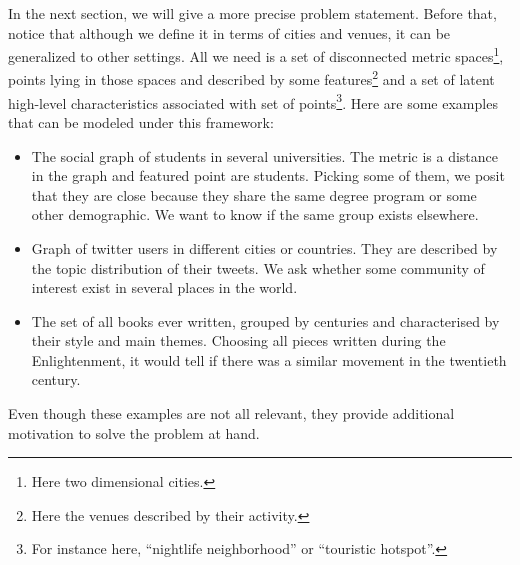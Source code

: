 In the next section, we will give a more precise problem statement. Before
that, notice that although we define it in terms of cities and venues, it can
be generalized to other settings. All we need is a set of disconnected metric
spaces\footnote{Here two dimensional cities.}, points lying in those spaces
and described by some features\footnote{Here the venues described by their
activity.} and a set of latent high-level characteristics associated with set
of points\footnote{For instance here, \enquote{nightlife neighborhood} or
\enquote{touristic hotspot}.}. Here are some examples that can be modeled
under this framework:
\begin{itemize}
	\item The social graph of students in several universities. The
		metric is a distance in the graph and featured point are
		students. Picking some of them, we posit that they are close because
        they share the same degree program or some other demographic. We
        want to know if the same group exists elsewhere.
	\item Graph of twitter users in different cities or countries. They are
        described by the topic distribution of their tweets. We ask whether
        some community of interest exist in several places in the world.
    \item The set of all books ever written, grouped by centuries and
        characterised by their style and main themes. Choosing all pieces
        written during the Enlightenment, it would tell if there was a
        similar movement in the twentieth century.
\end{itemize}
Even though these examples are not all relevant, they provide additional
motivation to solve the problem at hand.
